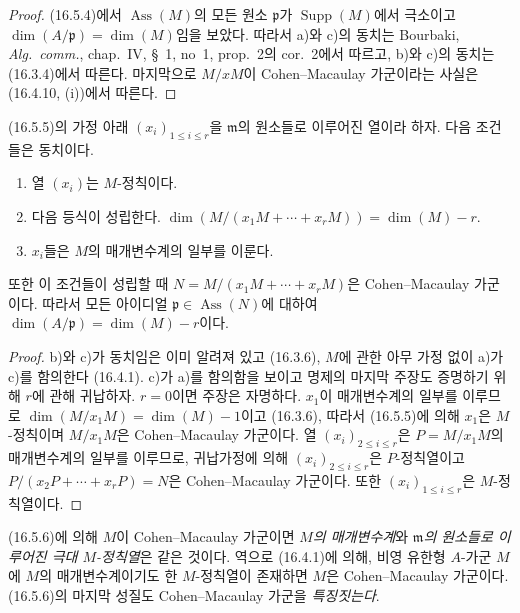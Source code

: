 \begin{proof}
(16.5.4)에서 $\operatorname{Ass}(M)$의 모든 원소
$\mathfrak{p}$가 $\operatorname{Supp}(M)$에서 극소이고
$\dim(A/\mathfrak{p})=\dim(M)$임을 보았다. 따라서 a)와 c)의 동치는
Bourbaki, \emph{Alg.~comm.}, chap.~IV, \S~1, no~1, prop.~2의
cor.~2에서 따르고, b)와 c)의 동치는 (16.3.4)에서 따른다. 마지막으로
$M/xM$이 Cohen--Macaulay 가군이라는 사실은 (16.4.10, (i))에서
따른다.
\end{proof}

\begin{corollary}[16.5.6]
\label{0.16.5.6-fr}
(16.5.5)의 가정 아래 $(x_i)_{1\leq i\leq r}$을
$\mathfrak{m}$의 원소들로 이루어진 열이라 하자. 다음 조건들은
동치이다.
\begin{enumerate}
  \item[a)] 열 $(x_i)$는 $M$-정칙이다.
  \item[b)] 다음 등식이 성립한다.
  $\dim(M/(x_1M+\cdots+x_rM))=\dim(M)-r$.
  \item[c)] $x_i$들은 $M$의 매개변수계의 일부를 이룬다.
\end{enumerate}
또한 이 조건들이 성립할 때
$N=M/(x_1M+\cdots+x_rM)$은 Cohen--Macaulay 가군이다. 따라서 모든
아이디얼 $\mathfrak{p}\in\operatorname{Ass}(N)$에 대하여
$\dim(A/\mathfrak{p})=\dim(M)-r$이다.
\end{corollary}

\begin{proof}
b)와 c)가 동치임은 이미 알려져 있고 (16.3.6), $M$에 관한 아무
가정 없이 a)가 c)를 함의한다 (16.4.1). c)가 a)를 함의함을 보이고
명제의 마지막 주장도 증명하기 위해 $r$에 관해 귀납하자. $r=0$이면
주장은 자명하다. $x_1$이 매개변수계의 일부를 이루므로
$\dim(M/x_1M)=\dim(M)-1$이고 (16.3.6), 따라서 (16.5.5)에 의해
$x_1$은 $M$-정칙이며 $M/x_1M$은 Cohen--Macaulay 가군이다.
열 $(x_i)_{2\leq i\leq r}$은 $P=M/x_1M$의 매개변수계의 일부를
이루므로, 귀납가정에 의해 $(x_i)_{2\leq i\leq r}$은 $P$-정칙열이고
$P/(x_2P+\cdots+x_rP)=N$은 Cohen--Macaulay 가군이다. 또한
$(x_i)_{1\leq i\leq r}$은 $M$-정칙열이다.
\end{proof}

\begin{remark}[16.5.7]
\label{0.16.5.7-fr}
(16.5.6)에 의해 $M$이 Cohen--Macaulay 가군이면 \emph{$M$의
매개변수계}와 \emph{$\mathfrak{m}$의 원소들로 이루어진 극대
$M$-정칙열}은 같은 것이다. 역으로 (16.4.1)에 의해, 비영 유한형
$A$-가군 $M$에 $M$의 매개변수계이기도 한 $M$-정칙열이 존재하면
$M$은 Cohen--Macaulay 가군이다. (16.5.6)의 마지막 성질도
Cohen--Macaulay 가군을 \emph{특징짓는다}.
\end{remark}

